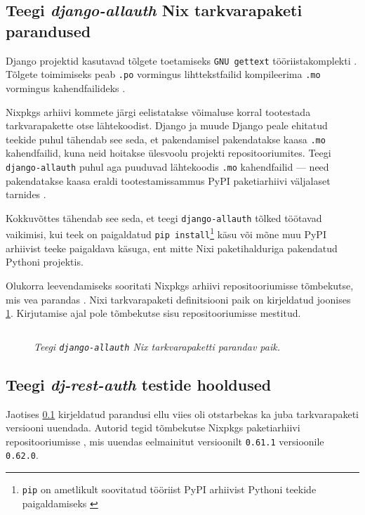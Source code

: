 \subsection{Teegi \textit{django-allauth} Nix tarkvarapaketi parandused}\label{subsec:compile-mo}

Django projektid kasutavad tõlgete toetamiseks \texttt{GNU gettext} tööriistakomplekti \cite{django-gettext}. Tõlgete toimimiseks peab \texttt{.po} vormingus lihttekstfailid kompileerima \texttt{.mo} vormingus kahendfailideks \cite{django-gettext}.

Nixpkgs arhiivi kommete järgi eelistatakse võimaluse korral tootestada tarkvarapakette otse lähtekoodist. Django ja muude Django peale ehitatud teekide puhul tähendab see seda, et pakendamisel pakendatakse kaasa \texttt{.mo} kahendfailid, kuna neid hoitakse ülesvoolu projekti repositooriumites. Teegi \texttt{django-allauth} puhul aga puuduvad lähtekoodis \texttt{.mo} kahendfailid — need pakendatakse kaasa eraldi tootestamissammus PyPI paketiarhiivi väljalaset tarnides \cite{django-allauth-no-mo-files}.

Kokkuvõttes tähendab see seda, et teegi \texttt{django-allauth} tõlked töötavad vaikimisi, kui teek on paigaldatud \texttt{pip install}\footnote{\texttt{pip} on ametlikult soovitatud tööriist PyPI arhiivist Pythoni teekide paigaldamiseks \cite{pip-standard}} käsu või mõne muu PyPI arhiivist teeke paigaldava käsuga, ent mitte Nixi paketihalduriga pakendatud Pythoni projektis.

Olukorra leevendamiseks sooritati Nixpkgs arhiivi repositooriumisse tõmbekutse, mis vea parandas \cite{nixpkgs-compile-mo}. Nixi tarkvarapaketi definitsiooni paik on kirjeldatud joonises \ref{fig:compile-mo-patch}. Kirjutamise ajal pole tõmbekutse sisu repositooriumisse mestitud. 

\begin{figure}
\inputminted[breaklines]{diff}{chapters/data/compile-mo.diff}
\caption{\emph{Teegi \texttt{django-allauth} Nix tarkvarapaketti parandav paik.}}\label{fig:compile-mo-patch}
\end{figure}

\subsection{Teegi \textit{dj-rest-auth} testide hooldused}

Jaotises \ref{subsec:compile-mo} kirjeldatud parandusi ellu viies oli otstarbekas ka juba tarkvarapaketi versiooni uuendada. Autorid tegid tõmbekutse Nixpkgs paketiarhiivi repositooriumisse \cite{allauth-bump-nixpkgs}, mis uuendas eelmainitut versioonilt \texttt{0.61.1} versioonile \texttt{0.62.0}.

